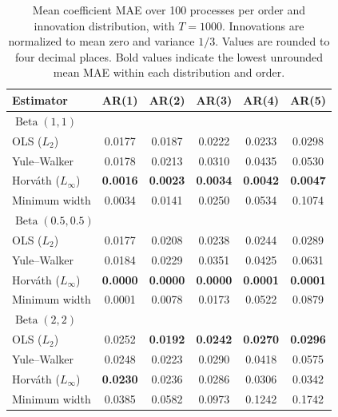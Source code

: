 \begin{table}[htbp]
\centering
\small
\setlength{\tabcolsep}{5pt}
\renewcommand{\arraystretch}{1.1}
\caption{Mean coefficient MAE over 100 processes per order and
innovation distribution, with $T=1000$. Innovations are normalized
to mean zero and variance $1/3$. Values are rounded to four decimal
places. Bold values indicate the lowest unrounded mean MAE within
each distribution and order.}
\label{tab:coefficient-estimation-all}

\begin{tabular}{lccccc}
\toprule
Estimator & AR(1) & AR(2) & AR(3) & AR(4) & AR(5) \\
\midrule

\multicolumn{6}{l}{$\operatorname{Beta}(1,1)$} \\
\addlinespace[2pt]
OLS ($L_2$)
 & 0.0177 & 0.0187 & 0.0222 & 0.0233 & 0.0298 \\
Yule--Walker
 & 0.0178 & 0.0213 & 0.0310 & 0.0435 & 0.0530 \\
Horv\'ath ($L_\infty$)
 & \textbf{0.0016} & \textbf{0.0023} & \textbf{0.0034}
 & \textbf{0.0042} & \textbf{0.0047} \\
Minimum width
 & 0.0034 & 0.0141 & 0.0250 & 0.0534 & 0.1074 \\
\midrule

\multicolumn{6}{l}{$\operatorname{Beta}(0.5,0.5)$} \\
\addlinespace[2pt]
OLS ($L_2$)
 & 0.0177 & 0.0208 & 0.0238 & 0.0244 & 0.0289 \\
Yule--Walker
 & 0.0184 & 0.0229 & 0.0351 & 0.0425 & 0.0631 \\
Horv\'ath ($L_\infty$)
 & \textbf{0.0000} & \textbf{0.0000} & \textbf{0.0000}
 & \textbf{0.0001} & \textbf{0.0001} \\
Minimum width
 & 0.0001 & 0.0078 & 0.0173 & 0.0522 & 0.0879 \\
\midrule

\multicolumn{6}{l}{$\operatorname{Beta}(2,2)$} \\
\addlinespace[2pt]
OLS ($L_2$)
 & 0.0252 & \textbf{0.0192} & \textbf{0.0242}
 & \textbf{0.0270} & \textbf{0.0296} \\
Yule--Walker
 & 0.0248 & 0.0223 & 0.0290 & 0.0418 & 0.0575 \\
Horv\'ath ($L_\infty$)
 & \textbf{0.0230} & 0.0236 & 0.0286 & 0.0306 & 0.0342 \\
Minimum width
 & 0.0385 & 0.0582 & 0.0973 & 0.1242 & 0.1742 \\
\midrule


\end{tabular}
\end{table}
